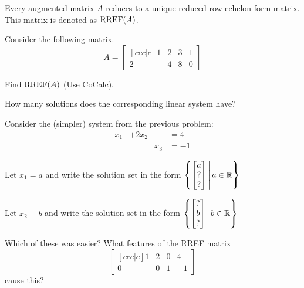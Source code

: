 
\begin{applicationActivities}{2}{4}

\begin{fact}
  Every augmented matrix \(A\) reduces to a unique reduced row echelon form
  matrix. This matrix is denoted as \(\operatorname{RREF}(A)\).
\end{fact}

\begin{activity}{10}
  Consider the following matrix.
  \[
    A = \begin{bmatrix}[ccc|c]
      1 & 2 & 3 & 1\\
      2 & 4 & 8 & 0
    \end{bmatrix}
  \]
  \begin{subactivity}
    Find \(\operatorname{RREF}(A)\) (Use CoCalc).
  \end{subactivity}
  \begin{subactivity}
    How many solutions does the corresponding linear system have?
  \end{subactivity}
\end{activity}

\begin{activity}{10}
Consider the (simpler) system from the previous problem:
	\begin{alignat*}{3}
		x_1 &+ 2x_2 & &= 4\\
	     	 & &x_3 &= -1
	\end{alignat*}
\begin{subactivity}
Let $x_1=a$ and write the solution set in the form 
\( \left\{ \begin{bmatrix} a \\ ? \\ ? \end{bmatrix} \,\middle|\, a \in \mathbb{R} \right\} \)
\end{subactivity}
\begin{subactivity}
Let $x_2=b$ and write the solution set in the form 
\( \left\{ \begin{bmatrix} ? \\ b \\ ? \end{bmatrix} \,\middle|\, b \in \mathbb{R} \right\} \)
\end{subactivity}
\begin{subactivity}
Which of these was easier?  What features of the RREF matrix \[\begin{bmatrix}[ccc|c] 1 & 2 & 0 & 4 \\ 0 & 0 & 1 & -1 \end{bmatrix}\] cause this?
\end{subactivity}
\end{activity}


\end{applicationActivities}
